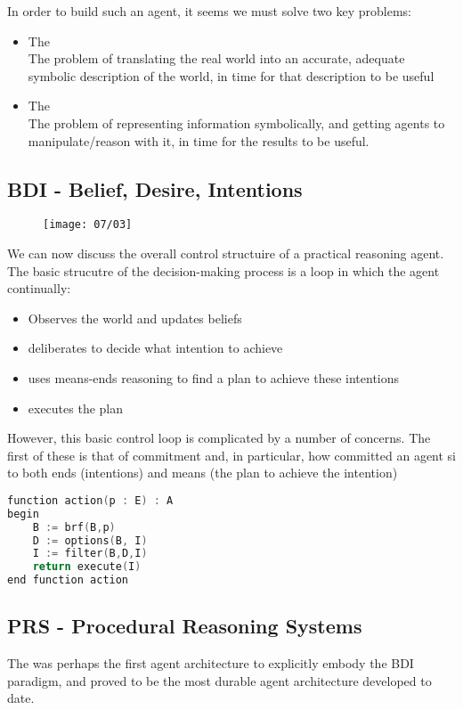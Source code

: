 In order to build such an agent, it seems we must solve two key problems:
\begin{itemize}
\item The \\
The problem of translating the real world into an accurate, adequate symbolic description of the world, in time for that description to be useful
\item The \\
The problem of representing information symbolically, and getting agents to manipulate/reason with it, in time for the results to be useful.
\end{itemize}
\subsection{BDI - Belief, Desire, Intentions}
\begin{figure}[!h]
\centering
\texttt{[image: 07/03]}
\end{figure}
We can now discuss the overall control structuire of a practical reasoning agent. The basic strucutre of the decision-making process is a loop in which the agent continually:
\begin{itemize}
\item Observes the world and updates beliefs
\item deliberates to decide what intention to achieve
\item uses means-ends reasoning to find a plan to achieve these intentions
\item executes the plan
\end{itemize}

However, this basic control loop is complicated by a number of concerns. The first of these is that of commitment and, in particular, how committed an agent si to both ends (intentions) and means (the plan to achieve the intention)
\begin{lstlisting}[language=C++]
function action(p : E) : A
begin
	B := brf(B,p)
	D := options(B, I)
	I := filter(B,D,I)
	return execute(I)
end function action
\end{lstlisting}

\subsection{PRS - Procedural Reasoning Systems}
The  was perhaps the first agent architecture to explicitly embody the BDI paradigm, and proved to be the most durable agent architecture developed to date.

